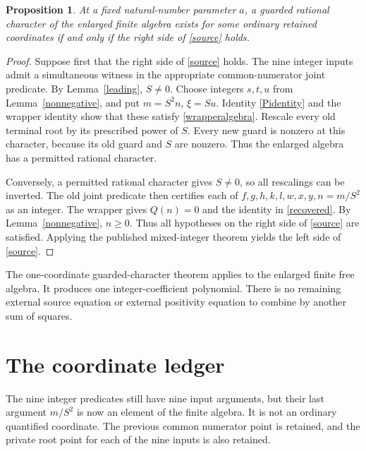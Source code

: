 \documentclass[11pt]{article}
\newtheorem{proposition}[theorem]{Proposition}
\begin{document}
\begin{proposition}\label{equivalence}
At a fixed natural-number parameter \(a\), a guarded rational character
of the enlarged finite algebra exists for some ordinary retained
coordinates if and only if the right side of \eqref{source} holds.
\end{proposition}
\begin{proof}
Suppose first that the right side of \eqref{source} holds.  The nine
integer inputs admit a simultaneous witness in the appropriate
common-numerator joint predicate.  By Lemma~\ref{leading}, \(S\ne0\).
Choose integers \(s,t,u\) from Lemma~\ref{nonnegative}, and put
\(m=S^2n\), \(\xi=Su\).  Identity \eqref{Pidentity} and the wrapper
identity show that these satisfy \eqref{wrapperalgebra}.  Rescale every
old terminal root by its prescribed power of \(S\).  Every new guard
is nonzero at this character, because its old guard and \(S\) are
nonzero.  Thus the enlarged algebra has a permitted rational character.

Conversely, a permitted rational character gives \(S\ne0\), so all
rescalings can be inverted.  The old joint predicate then certifies
each of \(f,g,h,k,l,w,x,y,n=m/S^2\) as an integer.  The wrapper gives
\(Q(n)=0\) and the identity in \eqref{recovered}.  By
Lemma~\ref{nonnegative}, \(n\ge0\).  Thus all hypotheses on the right
side of \eqref{source} are satisfied.  Applying the published
mixed-integer theorem yields the left side of \eqref{source}.
\end{proof}

The one-coordinate guarded-character theorem \cite{Encoder} applies
to the enlarged finite free algebra.  It produces one
integer-coefficient polynomial.  There is no remaining external source
equation or external positivity equation to combine by another sum of
squares.

\section{The coordinate ledger}

The nine integer predicates still have nine input arguments, but their
last argument \(m/S^2\) is now an element of the finite algebra.  It is
not an ordinary quantified coordinate.  The previous common numerator
point is retained, and the private root point for each of the nine
inputs is also retained.
\end{document}
